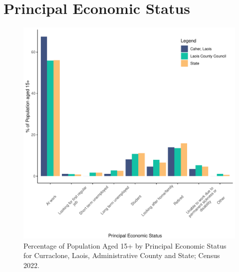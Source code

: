 \documentclass{article}
\begin{document}
  
\pagebreak
\section{Principal Economic Status}\label{sect:PES}
\begin{figure}[H]
	\centering
	\includegraphics[width = 140mm]{../figures/PESED.pdf}
	\caption{Percentage of Population Aged 15+ by Principal Economic Status for Curraclone, Laois, Administrative County and State; Census 2022.}
	\label{fig:vbnv}
	\end{figure}
\end{document}
